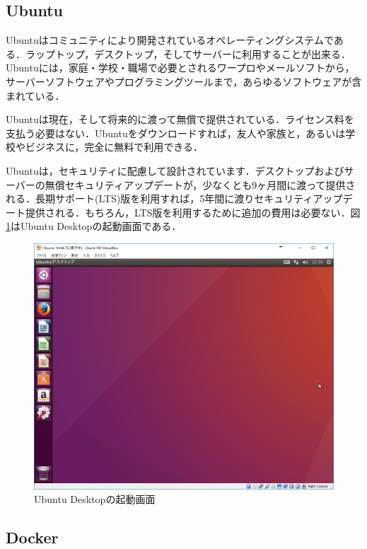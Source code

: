 \newpage

\subsection{Ubuntu}

Ubuntu\cite{ubuntu}はコミュニティにより開発されているオペレーティングシステムである．ラップトップ，デスクトップ，そしてサーバーに利用することが出来る．Ubuntuには，家庭・学校・職場で必要とされるワープロやメールソフトから，サーバーソフトウェアやプログラミングツールまで，あらゆるソフトウェアが含まれている．

Ubuntuは現在，そして将来的に渡って無償で提供されている．ライセンス料を支払う必要はない．Ubuntuをダウンロードすれば，友人や家族と，あるいは学校やビジネスに，完全に無料で利用できる．

Ubuntuは，セキュリティに配慮して設計されています．デスクトップおよびサーバーの無償セキュリティアップデートが，少なくとも9ヶ月間に渡って提供される．長期サポート(LTS)版を利用すれば，5年間に渡りセキュリティアップデート提供される．もちろん，LTS版を利用するために追加の費用は必要ない．図\ref{ubuntu}はUbuntu Desktopの起動画面である．

\begin{figure}[htb]
\centering
\includegraphics[width=12cm]{images/ubuntu.png}
\caption{Ubuntu Desktopの起動画面}\label{ubuntu}
\end{figure}

\newpage

\subsection{Docker}

